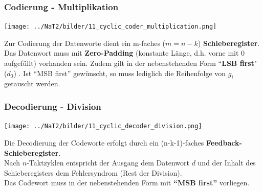 \subsubsection{Codierung - Multiplikation }
\begin{minipage}{9cm}
	\texttt{[image: ../NaT2/bilder/11\_cyclic\_coder\_multiplication.png]}
\end{minipage}
\begin{minipage}{9.5cm}
	Zur Codierung der Datenworte dient ein m-faches ($m = n-k$) \textbf{Schieberegister}. \\
	Das Datenwort muss mit \textbf{Zero-Padding} (konstante Länge, d.h. vorne mit 0 aufgefüllt) vorhanden sein.
	Zudem gilt in der nebenstehenden Form ``\textbf{LSB first}" ($d_0$) . Ist ``MSB first'' gewünscht, so muss
	lediglich die Reihenfolge von $g_i$ getauscht werden.
\end{minipage}

\subsubsection{Decodierung - Division }
\begin{minipage}{9.4cm}
	\texttt{[image: ../NaT2/bilder/11\_cyclic\_decoder\_division.png]}
\end{minipage}
\begin{minipage}{9cm}
	Die Decodierung der Codeworte erfolgt durch ein (n-k-1)-faches \textbf{Feedback-Schieberegister}.\\
	Nach $n$-Taktzyklen entspricht der Ausgang dem Datenwort $d$ und der Inhalt des Schieberegisters
	dem Fehlersyndrom (Rest der Division). \\ 
	Das Codewort muss in der nebenstehenden Form mit \textbf{``MSB first''} vorliegen.
\end{minipage}


